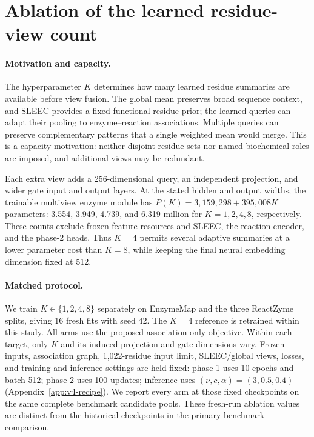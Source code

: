 \section{Ablation of the learned residue-view count}
\label{app:v4-k-ablation}

\paragraph{Motivation and capacity.}
The hyperparameter $K$ determines how many learned residue summaries are
available before view fusion. The global mean preserves broad sequence
context, and SLEEC provides a fixed functional-residue prior; the learned
queries can adapt their pooling to enzyme--reaction associations. Multiple
queries can preserve complementary patterns that a single weighted mean
would merge. This is a capacity motivation: neither disjoint residue sets
nor named biochemical roles are imposed, and additional views may be redundant.

Each extra view adds a 256-dimensional query, an independent projection,
and wider gate input and output layers. At the stated hidden and output
widths, the trainable multiview enzyme module has
$P(K)=3{,}159{,}298+395{,}008K$ parameters: 3.554, 3.949, 4.739, and
6.319 million for $K=1,2,4,8$, respectively. These counts exclude frozen
feature resources and SLEEC, the reaction encoder, and the phase-2 heads.
Thus $K=4$ permits several adaptive summaries at a lower parameter cost than
$K=8$, while keeping the final neural embedding dimension fixed at 512.

\paragraph{Matched protocol.}
We train $K\in\{1,2,4,8\}$ separately on EnzymeMap and the three ReactZyme
splits, giving 16 fresh fits with seed 42. The $K=4$ reference is retrained
within this study. All arms use the proposed association-only objective.
Within each target, only $K$ and its induced
projection and gate dimensions vary. Frozen inputs, association graph,
1,022-residue input limit, SLEEC/global views, losses, and training and
inference settings are held fixed: phase 1 uses 10 epochs and batch 512;
phase 2 uses 100 updates; inference uses $(\nu,c,\alpha)=(3,0.5,0.4)$
(Appendix~\ref{app:v4-recipe}). We report every arm at those fixed checkpoints
on the same complete benchmark candidate pools. These fresh-run ablation
values are distinct from the historical checkpoints in the primary
benchmark comparison.

